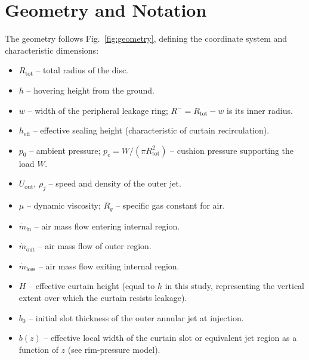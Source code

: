 \documentclass[11pt,a4paper]{article}
\begin{document}
\section{Geometry and Notation}
\label{sec:geometry}
The geometry follows Fig.~\ref{fig:geometry}, defining the coordinate system and characteristic dimensions:
\begin{itemize}
  \item $R_{\mathrm{tot}}$ -- total radius of the disc.
  \item $h$ -- hovering height from the ground.
  \item $w$ -- width of the peripheral leakage ring; $R^{-}=R_{\mathrm{tot}}-w$ is its inner radius.
  \item $h_{\mathrm{eff}}$ -- effective sealing height (characteristic of curtain recirculation).
  \item $p_0$ -- ambient pressure; $p_c=W/(\pi R_{\mathrm{tot}}^2)$ -- cushion pressure supporting the load $W$.
  \item $U_{\mathrm{out}}$, $\rho_j$ -- speed and density of the outer jet.
  \item $\mu$ -- dynamic viscosity; $R_g$ -- specific gas constant for air.
  \item $\dot{m}_{\mathrm{in}}$ -- air mass flow entering internal region.
  \item $\dot{m}_{\mathrm{out}}$ -- air mass flow of outer region.
  \item $\dot{m}_{\mathrm{loss}}$ -- air mass flow exiting internal region.
  \item $H$ -- effective curtain height (equal to $h$ in this study, representing the vertical extent over which the curtain resists leakage).
  \item $b_0$ -- initial slot thickness of the outer annular jet at injection.
  \item $b(z)$ -- effective local width of the curtain slot or equivalent jet region as a function of $z$ (see rim-pressure model).
\end{itemize}
\end{document}
